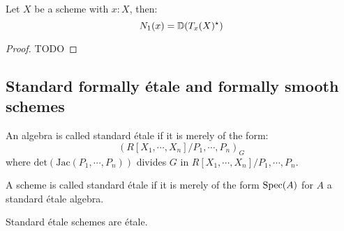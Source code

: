 \begin{lemma}\label{duality-infinitesimal-tangent}
Let $X$ be a scheme with $x:X$, then:
\[N_1(x) = \mathbb{D}(T_x(X)^\star)\]
\end{lemma}

\begin{proof}
TODO
\end{proof}



\subsection{Standard formally étale and formally smooth schemes}

\begin{definition}
An algebra is called standard étale if it is merely of the form:
\[(R[X_1,\cdots,X_n]/P_1,\cdots,P_n)_G\]
where $\mathrm{det}(\mathrm{Jac}(P_1,\cdots,P_n))$ divides $G$ in $R[X_1,\cdots,X_n]/P_1,\cdots,P_n$.
\end{definition}

\begin{definition}
A scheme is called standard étale if it is merely of the form $\operatorname{Spec}(A)$ for $A$ a standard étale algebra.
\end{definition}

\begin{lemma}\label{standard-etale-are-etale}
Standard étale schemes are étale.
\end{lemma}


